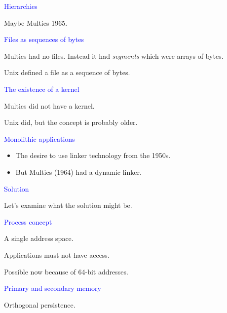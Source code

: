 \documentclass{slides}
\newcommand{\ti}[1]{\begin{center}\Large{\textcolor{blue}{#1}}\end{center}}
\begin{document}
\begin{slide}\ti{Hierarchies}

Maybe Multics 1965.

\vfill\end{slide}
\begin{slide}\ti{Files as sequences of bytes}

Multics had no files.  Instead it had \emph{segments} which were
arrays of bytes.

Unix defined a file as a sequence of bytes.

\vfill\end{slide}
\begin{slide}\ti{The existence of a kernel}

Multics did not have a kernel.

Unix did, but the concept is probably older.

\vfill\end{slide}
\begin{slide}\ti{Monolithic applications}

  \begin{itemize}
  \item The desire to use linker technology from the 1950s.
  \item But Multics (1964) had a dynamic linker.
  \end{itemize}

\vfill\end{slide}
\begin{slide}\ti{Solution}

Let's examine what the solution might be.

\vfill\end{slide}
\begin{slide}\ti{Process concept}

A single address space.

Applications must not have access.

Possible now because of 64-bit addresses.

\vfill\end{slide}
\begin{slide}\ti{Primary and secondary memory}

Orthogonal persistence.

\vfill\end{slide}
\end{document}

